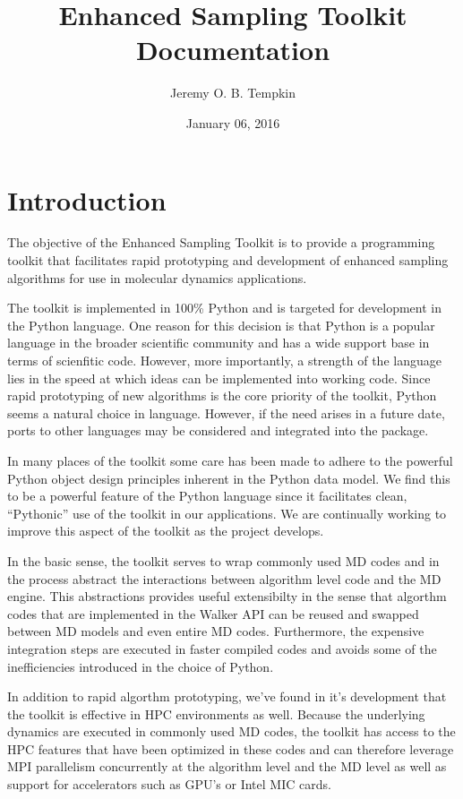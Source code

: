 \documentclass[letterpaper,10pt,english]{sphinxmanual}
\title{Enhanced Sampling Toolkit Documentation}
\date{January 06, 2016}
\author{Jeremy O. B. Tempkin}
\begin{document}
\maketitle
\tableofcontents
{}\label{index::doc}



\chapter{Introduction}
\label{intro.doc:introduction}\label{intro.doc:welcome-to-enhanced-sampling-toolkit-s-documentation}\label{intro.doc::doc}
The objective of the Enhanced Sampling Toolkit is to provide a programming toolkit that facilitates rapid prototyping and development of enhanced sampling algorithms for use in molecular dynamics applications.

The toolkit is implemented in 100\% Python and is targeted for development in the Python language. One reason for this decision is that Python is a popular language in the broader scientific community and has a wide support base in terms of scienfitic code. However, more importantly, a strength of the language lies in the speed at which ideas can be implemented into working code. Since rapid prototyping of new algorithms is the core priority of the toolkit, Python seems a natural choice in language. However, if the need arises in a future date, ports to other languages may be considered and integrated into the package.

In many places of the toolkit some care has been made to adhere to the powerful Python object design principles inherent in the Python data model. We find this to be a powerful feature of the Python language since it facilitates clean, ``Pythonic'' use of the toolkit in our applications. We are continually working to improve this aspect of the toolkit as the project develops.

In the basic sense, the toolkit serves to wrap commonly used MD codes and in the process abstract the interactions between algorithm level code and the MD engine. This abstractions provides useful extensibilty in the sense that algorthm codes that are implemented in the Walker API can be reused and swapped between MD models and even entire MD codes. Furthermore, the expensive integration steps are executed in faster compiled codes and avoids some of the inefficiencies introduced in the choice of Python.

In addition to rapid algorthm prototyping, we've found in it's development that the toolkit is effective in HPC environments as well. Because the underlying dynamics are executed in commonly used MD codes, the toolkit has access to the HPC features that have been optimized in these codes and can therefore leverage MPI parallelism concurrently at the algorithm level and the MD level as well as support for accelerators such as GPU's or Intel MIC cards.
\end{document}
